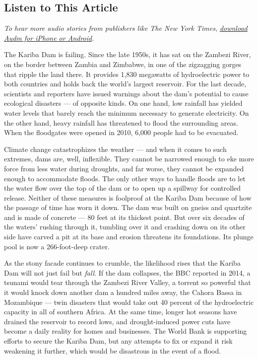 \hypertarget{listen-to-this-article}{%
\subsection{Listen to This Article}\label{listen-to-this-article}}

\emph{To hear more audio stories from publishers like The New York
Times,}
\emph{\href{https://www.audm.com/?utm_source=nytmag\&utm_medium=embed\&utm_campaign=river_of_time}{download
Audm for iPhone or Android}.}

The Kariba Dam is failing. Since the late 1950s, it has sat on the
Zambezi River, on the border between Zambia and Zimbabwe, in one of the
zigzagging gorges that ripple the land there. It provides 1,830
megawatts of hydroelectric power to both countries and holds back the
world's largest reservoir. For the last decade, scientists and reporters
have issued warnings about the dam's potential to cause ecological
disasters --- of opposite kinds. On one hand, low rainfall has yielded
water levels that barely reach the minimum necessary to generate
electricity. On the other hand, heavy rainfall has threatened to flood
the surrounding areas. When the floodgates were opened in 2010, 6,000
people had to be evacuated.

Climate change catastrophizes the weather --- and when it comes to such
extremes, dams are, well, inflexible. They cannot be narrowed enough to
eke more force from less water during droughts, and far worse, they
cannot be expanded enough to accommodate floods. The only other ways to
handle floods are to let the water flow over the top of the dam or to
open up a spillway for controlled release. Neither of these measures is
foolproof at the Kariba Dam because of how the passage of time has worn
it down. The dam was built on gneiss and quartzite and is made of
concrete --- 80 feet at its thickest point. But over six decades of the
waters' rushing through it, tumbling over it and crashing down on its
other side have carved a pit at its base and erosion threatens its
foundations. Its plunge pool is now a 266-foot-deep crater.

As the stony facade continues to crumble, the likelihood rises that the
Kariba Dam will not just fail but \emph{fall}. If the dam collapses, the
BBC reported in 2014, a tsunami would tear through the Zambezi River
Valley, a torrent so powerful that it would knock down another dam a
hundred miles away, the Cahora Bassa in Mozambique --- twin disasters
that would take out 40 percent of the hydroelectric capacity in all of
southern Africa. At the same time, longer hot seasons have drained the
reservoir to record lows, and drought-induced power cuts have become a
daily reality for homes and businesses. The World Bank is supporting
efforts to secure the Kariba Dam, but any attempts to fix or expand it
risk weakening it further, which would be disastrous in the event of a
flood.


